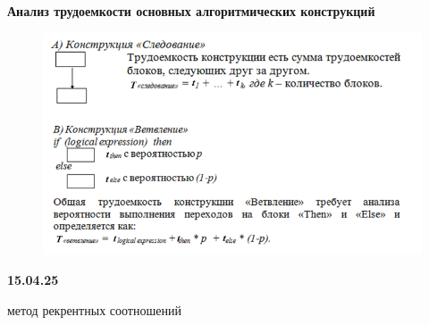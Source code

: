 \documentclass{article}
\begin{document}
\textbf{Анализ трудоемкости основных алгоритмических конструкций}

\begin{figure} [H]
    \includegraphics[width=1\linewidth]{Снимок экрана 2025-04-01 090309.png}
\end{figure}



\vspace{1cm}

\textbf{15.04.25}


метод рекрентных соотношений
\end{document}
